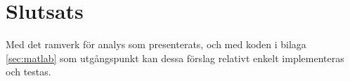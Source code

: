 \documentclass[../rapport_MVEX01-11-05]{subfiles}
\begin{document}
\section{Slutsats}
Med det ramverk för analys som presenterats, och med koden i bilaga
\ref{sec:matlab} som utgångspunkt kan dessa förslag relativt enkelt
implementeras och testas.

\end{document}
